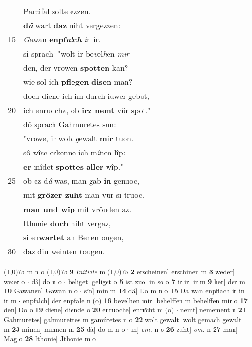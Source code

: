 \documentclass[8pt,a4paper,notitlepage]{article}
\begin{document}
\begin{table}[ht]
\begin{minipage}[t]{0.5\linewidth}
\begin{tabular}{rl}
 & Parcifal solte ezzen.\\ 
 & \textbf{d\textit{â}} wart \textbf{daz} niht vergezzen:\\ 
15 & \textit{G}awan \textbf{enpf\textit{al}c\textit{h}} \textit{i}n ir.\\ 
 & si sprach: "wolt ir be\textit{v}el\textit{h}en \textit{mir}\\ 
 & den, der vrowen \textbf{spotten} kan?\\ 
 & wie sol ich \textbf{pflegen} \textbf{disen} man?\\ 
 & doch diene ich im durch iuwer gebot;\\ 
20 & ich enruoch\textit{e}, ob \textbf{irz nemt} vür spot."\\ 
 & dô sprach Gahmuretes sun:\\ 
 & "vrowe, ir wol\textit{t g}ewalt \textbf{mir} tuon.\\ 
 & sô wîse erkenne ich m\textit{î}nen lîp:\\ 
 & \textbf{er} mîdet \textbf{spottes} \textbf{aller} wîp."\\ 
25 & ob ez d\textit{â} was, man gab \textbf{in} genuoc,\\ 
 & mit \textbf{grôzer zuht} man vür si truoc.\\ 
 & \textbf{man und wîp} mit vröuden az.\\ 
 & Ithonie \textbf{doch} niht vergaz,\\ 
 & si en\textbf{wartet} an Benen ougen,\\ 
30 & daz diu weinten tougen.\\ 
\end{tabular}
\scriptsize
\line(1,0){75} \newline
m n o \newline
\line(1,0){75} \newline
\textbf{9} \textit{Initiale} m  \newline
\line(1,0){75} \newline
\textbf{2} erscheinen] erschinen m \textbf{3} weder] we:er o  $\cdot$ dâ] do n o  $\cdot$ beliget] geliget o \textbf{5} ist zuo] in so o \textbf{7} ir ir] ir m \textbf{9} her] der m \textbf{10} Gawanen] Gawan n o  $\cdot$ sîn] min m \textbf{14} dâ] Do m n o \textbf{15} Da wan enpflach ir in ir m  $\cdot$ enpfalch] der enpfale n (o) \textbf{16} bevelhen mir] behelffen m behelffen mir o \textbf{17} den] Do o \textbf{19} diene] diende o \textbf{20} enruoche] enruͯcht m (o)  $\cdot$ nemt] nemement n \textbf{21} Gahmuretes] gahmurettes m gamúretes n o \textbf{22} wolt gewalt] wolt gemach gewalt m \textbf{23} mînen] minnen m \textbf{25} dâ] do m n o  $\cdot$ in] \textit{om.} n o \textbf{26} zuht] \textit{om.} n \textbf{27} man] Mag o \textbf{28} Ithonie] Jthonie m o \newline
\end{minipage}
\end{table}
\end{document}
